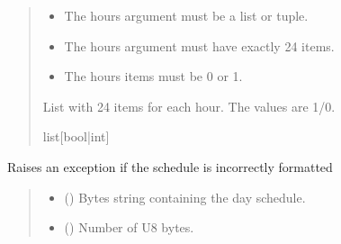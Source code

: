 \documentclass[letterpaper,10pt,english]{sphinxmanual}
\begin{document}
\begin{fulllineitems}
\begin{fulllineitems}
\begin{quote}
\begin{description}
\begin{itemize}
\item {} 
\sphinxAtStartPar
{} \textendash{} The hours argument must be a list or tuple.

\item {} 
\sphinxAtStartPar
{} \textendash{} The hours argument must have exactly 24 items.

\item {} 
\sphinxAtStartPar
{} \textendash{} The hours items must be 0 or 1.

\end{itemize}

\sphinxAtStartPar
List with 24 items for each hour. The values are 1/0.

\sphinxAtStartPar
list{[}bool|int{]}

\end{description}\end{quote}

\end{fulllineitems}


\begin{fulllineitems}
\label{\detokenize{PodDevice_8229:PodDevice_8229.POD_8229._Validate_Schedule}}
\pysigstartsignatures
{}
\pysigstopsignatures
\sphinxAtStartPar
Raises an exception if the schedule is incorrectly formatted
\begin{quote}\begin{description}
\begin{itemize}
\item {} 
\sphinxAtStartPar
{} () \textendash{} Bytes string containing the day schedule.

\item {} 
\sphinxAtStartPar
{} () \textendash{} Number of U8 bytes.


\end{itemize}
\end{description}
\end{quote}
\end{fulllineitems}
\end{fulllineitems}
\end{document}
